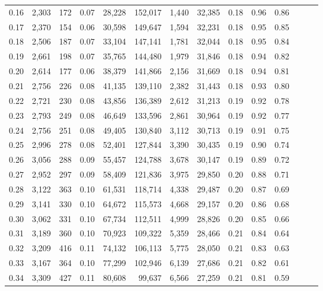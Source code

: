 \begin{tabular}{rrrrrrrrrrrrrr}
0.16 &  2,303 &  172 &  0.07 &   28,228 &  152,017 &   1,440 &  32,385 &  0.18 &  0.96 &      0.86 \\
0.17 &  2,370 &  154 &  0.06 &   30,598 &  149,647 &   1,594 &  32,231 &  0.18 &  0.95 &      0.85 \\
0.18 &  2,506 &  187 &  0.07 &   33,104 &  147,141 &   1,781 &  32,044 &  0.18 &  0.95 &      0.84 \\
0.19 &  2,661 &  198 &  0.07 &   35,765 &  144,480 &   1,979 &  31,846 &  0.18 &  0.94 &      0.82 \\
0.20 &  2,614 &  177 &  0.06 &   38,379 &  141,866 &   2,156 &  31,669 &  0.18 &  0.94 &      0.81 \\
0.21 &  2,756 &  226 &  0.08 &   41,135 &  139,110 &   2,382 &  31,443 &  0.18 &  0.93 &      0.80 \\
0.22 &  2,721 &  230 &  0.08 &   43,856 &  136,389 &   2,612 &  31,213 &  0.19 &  0.92 &      0.78 \\
0.23 &  2,793 &  249 &  0.08 &   46,649 &  133,596 &   2,861 &  30,964 &  0.19 &  0.92 &      0.77 \\
0.24 &  2,756 &  251 &  0.08 &   49,405 &  130,840 &   3,112 &  30,713 &  0.19 &  0.91 &      0.75 \\
0.25 &  2,996 &  278 &  0.08 &   52,401 &  127,844 &   3,390 &  30,435 &  0.19 &  0.90 &      0.74 \\
0.26 &  3,056 &  288 &  0.09 &   55,457 &  124,788 &   3,678 &  30,147 &  0.19 &  0.89 &      0.72 \\
0.27 &  2,952 &  297 &  0.09 &   58,409 &  121,836 &   3,975 &  29,850 &  0.20 &  0.88 &      0.71 \\
0.28 &  3,122 &  363 &  0.10 &   61,531 &  118,714 &   4,338 &  29,487 &  0.20 &  0.87 &      0.69 \\
0.29 &  3,141 &  330 &  0.10 &   64,672 &  115,573 &   4,668 &  29,157 &  0.20 &  0.86 &      0.68 \\
0.30 &  3,062 &  331 &  0.10 &   67,734 &  112,511 &   4,999 &  28,826 &  0.20 &  0.85 &      0.66 \\
0.31 &  3,189 &  360 &  0.10 &   70,923 &  109,322 &   5,359 &  28,466 &  0.21 &  0.84 &      0.64 \\
0.32 &  3,209 &  416 &  0.11 &   74,132 &  106,113 &   5,775 &  28,050 &  0.21 &  0.83 &      0.63 \\
0.33 &  3,167 &  364 &  0.10 &   77,299 &  102,946 &   6,139 &  27,686 &  0.21 &  0.82 &      0.61 \\
0.34 &  3,309 &  427 &  0.11 &   80,608 &   99,637 &   6,566 &  27,259 &  0.21 &  0.81 &      0.59 \\

\end{tabular}
